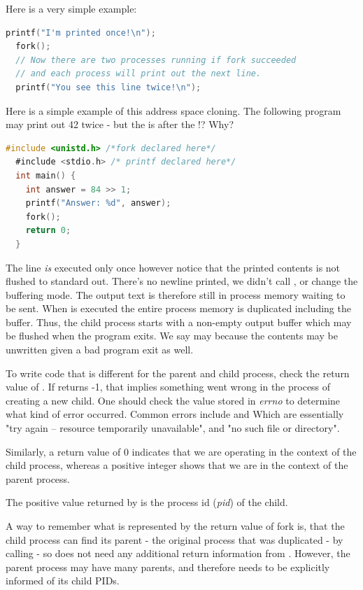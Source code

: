 \begin{itemize}
Here is a very simple example:

\begin{lstlisting}[language=C]
  printf("I'm printed once!\n");
  fork();
  // Now there are two processes running if fork succeeded
  // and each process will print out the next line.
  printf("You see this line twice!\n");
\end{lstlisting}

Here is a simple example of this address space cloning.
The following program may print out 42 twice - but the  is after the !? Why?

\begin{lstlisting}[language=C]
  #include <unistd.h> /*fork declared here*/
  #include <stdio.h> /* printf declared here*/
  int main() {
    int answer = 84 >> 1;
    printf("Answer: %d", answer);
    fork();
    return 0;
  }
\end{lstlisting}

The  line \emph{is} executed only once however notice that the printed contents is not flushed to standard out.
There's no newline printed, we didn't call , or change the buffering mode.
The output text is therefore still in process memory waiting to be sent.
When  is executed the entire process memory is duplicated including the buffer.
Thus, the child process starts with a non-empty output buffer which may be flushed when the program exits.
We say may because the contents may be unwritten given a bad program exit as well.

To write code that is different for the parent and child process, check the return value of .
If  returns -1, that implies something went wrong in the process of creating a new child.
One should check the value stored in \emph{errno} to determine what kind of error occurred.
Common errors include  and  Which are essentially "try again -- resource temporarily unavailable", and "no such file or directory".

Similarly, a return value of 0 indicates that we are operating in the context of the child process, whereas a positive integer shows that we are in the context of the parent process.

The positive value returned by  is the process id (\emph{pid}) of the child.

A way to remember what is represented by the return value of fork is, that the child process can find its parent - the original process that was duplicated - by calling  - so does not need any additional return information from . However, the parent process may have many parents, and therefore needs to be explicitly informed of its child PIDs.


\end{itemize}

